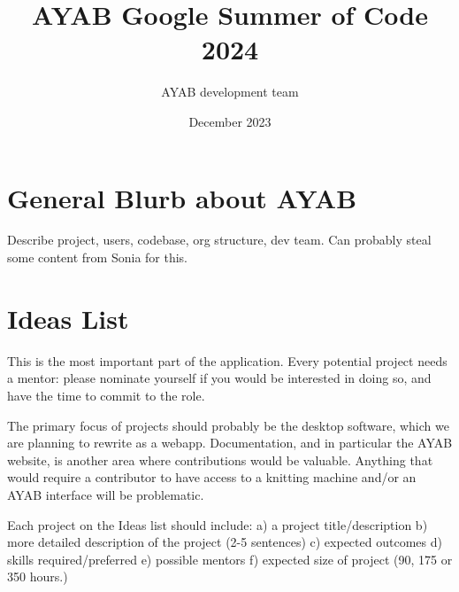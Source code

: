 \documentclass{article}
\title{AYAB Google Summer of Code 2024}
\author{AYAB development team}
\date{December 2023}
\begin{document}
\maketitle

\section{General Blurb about AYAB}

Describe project, users, codebase, org structure, dev team. Can probably steal some content from Sonia for this.

\section{Ideas List}

This is the most important part of the application. Every potential project needs a mentor: please nominate yourself if you would be interested in doing so, and have the time to commit to the role.

The primary focus of projects should probably be the desktop software, which we are planning to rewrite as a webapp. Documentation, and in particular the AYAB website, is another area where contributions would be valuable. Anything that would require a contributor to have access to a knitting machine and/or an AYAB interface will be problematic.

Each project on the Ideas list should include: a) a project title/description b) more detailed description of the project (2-5 sentences) c) expected outcomes d) skills required/preferred e) possible mentors f) expected size of project (90, 175 or 350 hours.)
\end{document}
